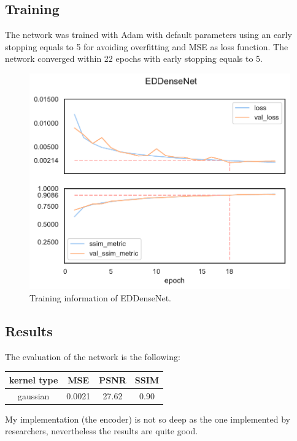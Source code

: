 \subsection{Training}
The network was trained with Adam\cite{adam} with default parameters using an early stopping equals to 5 for avoiding overfitting and MSE as loss function.
The network converged within 22 epochs with early stopping equals to 5.
\begin{figure}[H]
    \centering
    \includegraphics[height=0.4\textheight,keepaspectratio]{subsections/densenet/plot_history_EDDenseNet.pdf}
    \caption{Training information of EDDenseNet.}
\end{figure}        

\subsection{Results}
The evaluation of the network is the following:
\begin{center}
    \small
    \begin{tabularx}{165pt}{c|ccc}
        \centering
        kernel type & MSE & PSNR & SSIM \\
        \hline
        gaussian & 0.0021 & 27.62 & 0.90
    \end{tabularx}        
\end{center}

My implementation (the encoder) is not so deep as the one implemented by researchers, nevertheless the results are quite good.

